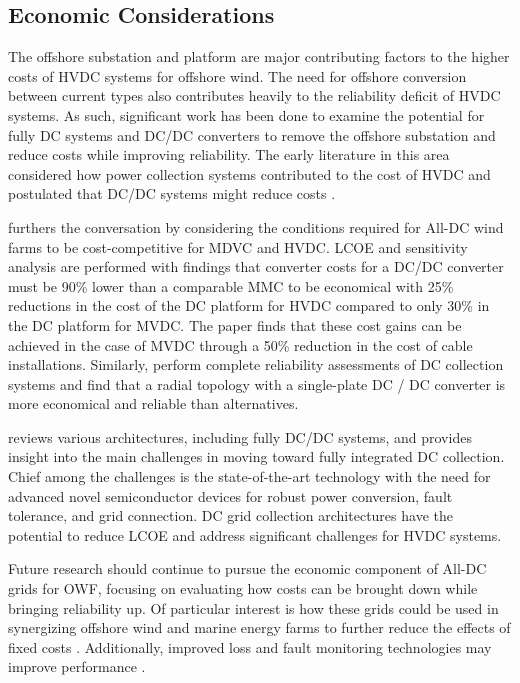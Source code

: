 \documentclass{ieeeaccess}
\begin{document}
\subsection{\textbf{Economic Considerations}}

The offshore substation and platform are major contributing factors to the higher costs of HVDC systems for offshore wind. The need for offshore conversion between current types also contributes heavily to the reliability deficit of HVDC systems. As such, significant work has been done to examine the potential for fully DC systems and DC/DC converters to remove the offshore substation and reduce costs while improving reliability. The early literature in this area considered how power collection systems contributed to the cost of HVDC and postulated that DC/DC systems might reduce costs \cite{zhan2010dc, bahirat2012comparison}.



\cite{timmers2023all} furthers the conversation by considering the conditions required for All-DC wind farms to be cost-competitive for MDVC and HVDC. LCOE and sensitivity analysis are performed with findings that converter costs for a DC/DC converter must be 90\% lower than a comparable MMC to be economical with 25\% reductions in the cost of the DC platform for HVDC compared to only 30\% in the DC platform for MVDC. The paper finds that these cost gains can be achieved in the case of MVDC through a 50\% reduction in the cost of cable installations.
Similarly, \cite{bai2024reliability,sun2021reliability} perform complete reliability assessments of DC collection systems and find that a radial topology with a single-plate DC / DC converter is more economical and reliable than alternatives.

\cite{lakshmanan2021electrical} reviews various architectures, including fully DC/DC systems, and provides insight into the main challenges in moving toward fully integrated DC collection. Chief among the challenges is the state-of-the-art technology with the need for advanced novel semiconductor devices for robust power conversion, fault tolerance, and grid connection. DC grid collection architectures have the potential to reduce LCOE and address significant challenges for HVDC systems.

Future research should continue to pursue the economic component of All-DC grids for OWF, focusing on evaluating how costs can be brought down while bringing reliability up. Of particular interest is how these grids could be used in synergizing offshore wind and marine energy farms to further reduce the effects of fixed costs \cite{perez2015review,fjellstedt2022review}. Additionally, improved loss and fault monitoring technologies may improve performance \cite{givi2018comprehensive}.
\end{document}
